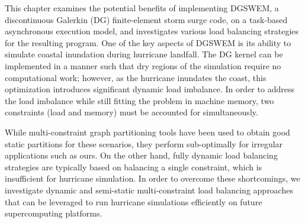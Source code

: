 This chapter examines the potential benefits of implementing DGSWEM, a discontinuous Galerkin (DG) finite-element storm surge code, on a task-based asynchronous execution model, and investigates various load balancing strategies for the resulting program.
One of the key aspects of DGSWEM is its ability to simulate coastal inundation during hurricane landfall.
The DG kernel can be implemented in a manner such that dry regions of the simulation require no computational work; however, as the hurricane inundates the coast, this optimization introduces significant dynamic load imbalance.
In order to address the load imbalance while still fitting the problem in machine memory, two constraints (load and memory) must be accounted for simultaneously.

While multi-constraint graph partitioning tools have been used to obtain good static partitions for these scenarios, they perform sub-optimally for irregular applications such as ours.
On the other hand, fully dynamic load balancing strategies are typically based on balancing a single constraint, which is insufficient for hurricane simulation.
In order to overcome these shortcomings, we investigate dynamic and semi-static multi-constraint load balancing approaches that can be leveraged to run hurricane simulations efficiently on future supercomputing platforms.

